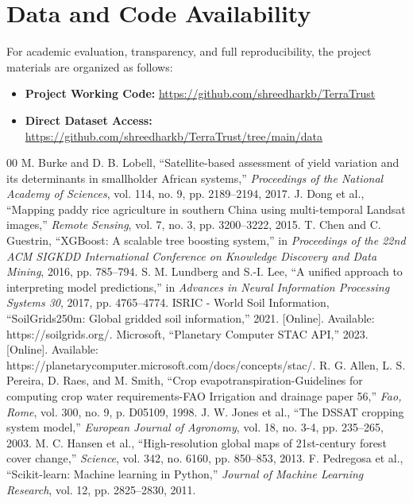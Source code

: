 \documentclass[conference]{IEEEtran}
\begin{document}
\section*{Data and Code Availability}
For academic evaluation, transparency, and full reproducibility, the project materials are organized as follows:
\begin{itemize}
    \item \textbf{Project Working Code:} \textcolor{blue}{\url{https://github.com/shreedharkb/TerraTrust}}
    \item \textbf{Direct Dataset Access:} \textcolor{blue}{\url{https://github.com/shreedharkb/TerraTrust/tree/main/data}}
\end{itemize}

\begin{thebibliography}{00}
 M. Burke and D. B. Lobell, ``Satellite-based assessment of yield variation and its determinants in smallholder African systems,'' \textit{Proceedings of the National Academy of Sciences}, vol. 114, no. 9, pp. 2189--2194, 2017.
 J. Dong et al., ``Mapping paddy rice agriculture in southern China using multi-temporal Landsat images,'' \textit{Remote Sensing}, vol. 7, no. 3, pp. 3200--3222, 2015.
 T. Chen and C. Guestrin, ``XGBoost: A scalable tree boosting system,'' in \textit{Proceedings of the 22nd ACM SIGKDD International Conference on Knowledge Discovery and Data Mining}, 2016, pp. 785--794.
 S. M. Lundberg and S.-I. Lee, ``A unified approach to interpreting model predictions,'' in \textit{Advances in Neural Information Processing Systems 30}, 2017, pp. 4765--4774.
 ISRIC - World Soil Information, ``SoilGrids250m: Global gridded soil information,'' 2021. [Online]. Available: https://soilgrids.org/.
 Microsoft, ``Planetary Computer STAC API,'' 2023. [Online]. Available: https://planetarycomputer.microsoft.com/docs/concepts/stac/.
 R. G. Allen, L. S. Pereira, D. Raes, and M. Smith, ``Crop evapotranspiration-Guidelines for computing crop water requirements-FAO Irrigation and drainage paper 56,'' \textit{Fao, Rome}, vol. 300, no. 9, p. D05109, 1998.
 J. W. Jones et al., ``The DSSAT cropping system model,'' \textit{European Journal of Agronomy}, vol. 18, no. 3-4, pp. 235--265, 2003.
 M. C. Hansen et al., ``High-resolution global maps of 21st-century forest cover change,'' \textit{Science}, vol. 342, no. 6160, pp. 850--853, 2013.
 F. Pedregosa et al., ``Scikit-learn: Machine learning in Python,'' \textit{Journal of Machine Learning Research}, vol. 12, pp. 2825--2830, 2011.

\end{thebibliography}
\end{document}
